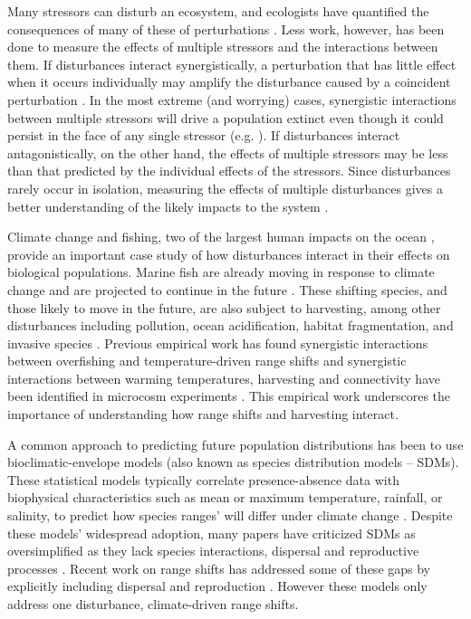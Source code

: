 \documentclass[12pt,english]{article}
\begin{document}
\begin{spacing}{1.9}
\begin{flushleft}
Many stressors can disturb an ecosystem, and ecologists have quantified the consequences of many of these of perturbations \citep{Wilcoveetal1998, Crainetal2008, DarlingCote2008}. Less work, however, has been done to measure the effects of multiple stressors and the interactions between them.  If disturbances interact synergistically, a perturbation that has little effect when it occurs individually may amplify the disturbance caused by a coincident perturbation \citep{Crainetal2008, DarlingCote2008,Nyeetal2013,Gurevitchetal2000}.   In the most extreme (and worrying) cases, synergistic interactions between multiple stressors will drive a population extinct even though it could persist in the face of any single stressor (e.g. \citet{Pelletieretal2006}).  If disturbances interact antagonistically, on the other hand, the effects of multiple stressors may be less than that predicted by the individual effects of the stressors.  Since disturbances rarely occur in isolation, measuring the effects of multiple disturbances gives a better understanding of the likely impacts to the system \citep{DoakMorris2010, Fordhametal2013, Foltetal1999}.


Climate change and fishing, two of the largest human impacts on the ocean \citep{Halpernetal2008}, provide an important case study of how disturbances interact in their effects on biological populations.  Marine fish are already moving in response to climate change \citep{Perryetal2005, HiddinkHoftstede2008, Rijnsdorpetal2009, Dulvyetal2008, Simpsonetal2011} and are projected to continue in the future \citep{Kelletal2005, Mackenzieetal2007}. These shifting species, and those likely to move in the future, are also subject to harvesting, among other disturbances including pollution, ocean acidification, habitat fragmentation, and invasive species \citep{Wilcoveetal1998, Salaetal2000, MEA2005, Pinskyetal2013, Barryetal1995, Nyeetal2009}. Previous empirical work has found synergistic interactions between overfishing and temperature-driven range shifts \citep{Lingetal2009} and synergistic interactions between warming temperatures, harvesting and connectivity have been identified in microcosm experiments \citep{Moraetal2007}. This empirical work underscores the importance of understanding how range shifts and harvesting interact. 

A common approach to predicting future population distributions has been to use bioclimatic-envelope models (also known as species distribution models -- SDMs). These statistical models typically correlate presence-absence data with biophysical characteristics such as mean or maximum temperature, rainfall, or salinity, to predict how species ranges' will differ under climate change \citep{Elithetal2006, GuisanThuiller2005, GuisanZimmerman2000}. Despite these models' widespread adoption, many papers have criticized SDMs as oversimplified as they lack species interactions, dispersal and reproductive processes \citep{KearneyPorter2009, Zarnetskeetal2012, Robinsonetal2011}.  Recent work on range shifts has addressed some of these gaps by explicitly including dispersal and reproduction \citep{Berestyckietal2009, ZhouKot2011}. However these models only address one disturbance, climate-driven range shifts.


\end{flushleft}
\end{spacing}
\end{document}
